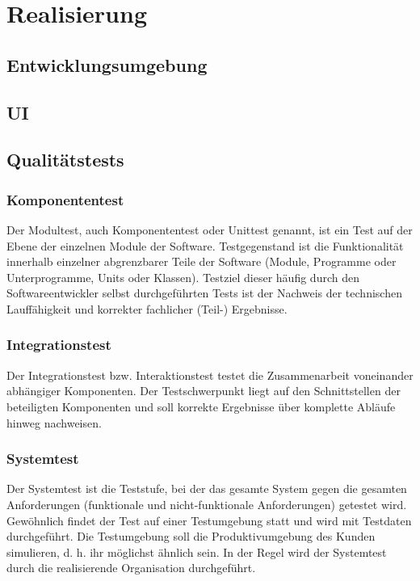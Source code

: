 \chapter{Realisierung}

\section{Entwicklungsumgebung}

\section{UI}

\section{Qualitätstests}

\subsection{Komponententest}
Der Modultest, auch Komponententest oder Unittest genannt, ist ein Test auf der Ebene der einzelnen Module der Software. Testgegenstand ist die Funktionalität innerhalb einzelner abgrenzbarer Teile der Software (Module, Programme oder Unterprogramme, Units oder Klassen). Testziel dieser häufig durch den Softwareentwickler selbst durchgeführten Tests ist der Nachweis der technischen Lauffähigkeit und korrekter fachlicher (Teil-) Ergebnisse.

\subsection{Integrationstest}

Der Integrationstest bzw. Interaktionstest testet die Zusammenarbeit voneinander abhängiger Komponenten. Der Testschwerpunkt liegt auf den Schnittstellen der beteiligten Komponenten und soll korrekte Ergebnisse über komplette Abläufe hinweg nachweisen.

\subsection{Systemtest}

Der Systemtest ist die Teststufe, bei der das gesamte System gegen die gesamten Anforderungen (funktionale und nicht-funktionale Anforderungen) getestet wird. Gewöhnlich findet der Test auf einer Testumgebung statt und wird mit Testdaten durchgeführt. Die Testumgebung soll die Produktivumgebung des Kunden simulieren, d. h. ihr möglichst ähnlich sein. In der Regel wird der Systemtest durch die realisierende Organisation durchgeführt.

